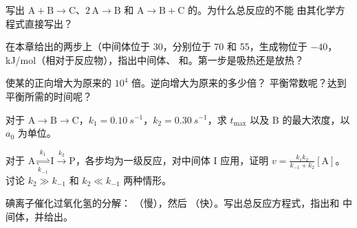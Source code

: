 \begin{exercise}[$\star$]\label{exo:b1:elementary-steps:2}
写出 $\mathrm{A} + \mathrm{B} \to
\mathrm{C}$、$2\,\mathrm{A} \to \mathrm{B}$ 和 $\mathrm{A} \to \mathrm{B} +
\mathrm{C}$ 的。为什么总反应的不能
由其化学方程式直接写出？
\end{exercise}

\begin{exercise}[$\star$]\label{exo:b1:elementary-steps:3}
在本章给出的两步上（中间体位于
30，分别位于 70 和 55，生成物位于 $-40$，
\unit{kJ/mol}（相对于反应物），指出中间体、
和。第一步是吸热还是放热？
\end{exercise}

\begin{exercise}[$\star$]\label{exo:b1:elementary-steps:4}
使某的正向增大为原来的
$10^4$ 倍。逆向增大为原来的多少倍？
平衡常数呢？达到平衡所需的时间呢？
\end{exercise}

\begin{exercise}[$\star\star$]\label{exo:b1:elementary-steps:5}
对于 $\mathrm{A} \to \mathrm{B} \to \mathrm{C}$，$k_1 =
\qty{0.10}{s^{-1}}$，$k_2 = \qty{0.30}{s^{-1}}$，求 $t_{\max}$ 以及
$\mathrm{B}$ 的最大浓度，以 $a_0$ 为单位。
\end{exercise}

\begin{exercise}[$\star\star$]\label{exo:b1:elementary-steps:6}
对于 $\mathrm{A} \underset{k_{-1}}{\overset{k_1}{\rightleftharpoons}}
\mathrm{I} \xrightarrow{k_2} \mathrm{P}$，各步均为一级反应，对中间体
$\mathrm{I}$ 应用，证明 $v =
\frac{k_1k_2}{k_{-1} + k_2}[\mathrm{A}]$。讨论 $k_2 \gg
k_{-1}$ 和 $k_2 \ll k_{-1}$ 两种情形。
\end{exercise}

\begin{exercise}[$\star\star$]\label{exo:b1:elementary-steps:7}
碘离子催化过氧化氢的分解：
（慢），然后 
（快）。写出总反应方程式，指出和
中间体，并给出。
\end{exercise}

